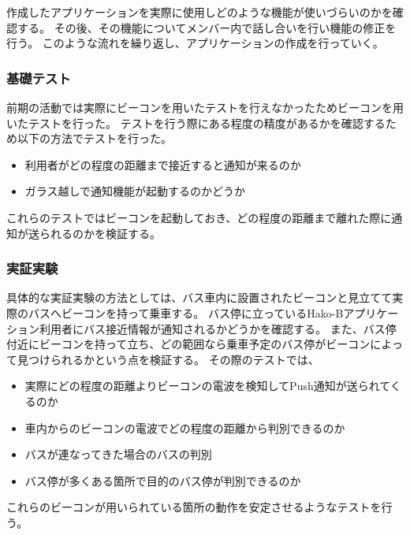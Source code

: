 \documentclass[openany,11pt,papersize]{jsbook}
\begin{document}
作成したアプリケーションを実際に使用しどのような機能が使いづらいのかを確認する。
その後、その機能についてメンバー内で話し合いを行い機能の修正を行う。
このような流れを繰り返し、アプリケーションの作成を行っていく。


\subsubsection{基礎テスト}
前期の活動では実際にビーコンを用いたテストを行えなかったためビーコンを用いたテストを行った。
テストを行う際にある程度の精度があるかを確認するため以下の方法でテストを行った。

\begin{itemize}

\item 利用者がどの程度の距離まで接近すると通知が来るのか
\item ガラス越しで通知機能が起動するのかどうか

\end{itemize}

これらのテストではビーコンを起動しておき、どの程度の距離まで離れた際に通知が送られるのかを検証する。


\subsubsection{実証実験}

具体的な実証実験の方法としては、バス車内に設置されたビーコンと見立てて実際のバスへビーコンを持って乗車する。
バス停に立っているHako-Bアプリケーション利用者にバス接近情報が通知されるかどうかを確認する。
また、バス停付近にビーコンを持って立ち、どの範囲なら乗車予定のバス停がビーコンによって見つけられるかという点を検証する。
その際のテストでは、
\begin{itemize}

\item 実際にどの程度の距離よりビーコンの電波を検知してPush通知が送られてくるのか
\item 車内からのビーコンの電波でどの程度の距離から判別できるのか
\item バスが連なってきた場合のバスの判別
\item バス停が多くある箇所で目的のバス停が判別できるのか

\end{itemize}
これらのビーコンが用いられている箇所の動作を安定させるようなテストを行う。
\end{document}

